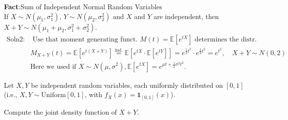 \textbf{Fact}:Sum of Independent Normal Random Variables\\
If $X \sim N(\mu_1, \sigma_1^2)$, $Y \sim N(\mu_2, \sigma_2^2)$ and $X$ and $Y$ are independent, then $X+Y \sim N(\mu_1+\mu_2, \sigma_1^2+\sigma_2^2)$.
    \begin{align*}
        \text{Soln2:} &\text{ Use that moment generating funct. } M(t) = \mathbb{E}[e^{tX}] \text{ determines the distr.}\\
        &M_{X+Y}(t) = \mathbb{E}[e^{t(X+Y)}] \stackrel{\text{ind.}}{=} \mathbb{E}[e^{tX} \cdot \mathbb{E}[e^{tY}]] = e^{\frac{1}{2}t^2} \cdot e^{\frac{1}{2}t^2} = e^{t^2}, \quad X+Y \sim N(0,2)\\
        &\text{Here we used if } X \sim N(\mu, \sigma^2), \mathbb{E}[e^{tX}] = e^{\mu t + \frac{1}{2}\sigma^2 t^2}.
        \end{align*} 
    \begin{example}{}
    Let $X, Y$ be independent random variables, each uniformly distributed on $[0,1]$ (i.e., $X, Y \sim \text{Uniform}[0,1]$, with $f_X(x) = \mathbf{1}_{[0,1]}(x)$).
    \end{example}
    
    \begin{problem}[]
    Compute the joint density function of $X+Y$.
    \end{problem}
    
